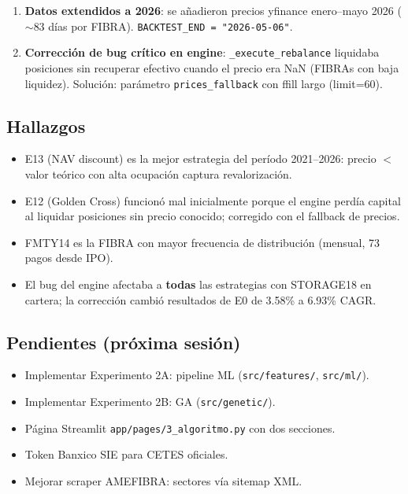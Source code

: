 \documentclass[12pt, a4paper]{article}
\begin{document}
\begin{enumerate}
  \item \textbf{Datos extendidos a 2026}: se a\~{n}adieron precios yfinance enero--mayo 2026
        ($\sim$83 d\'{i}as por FIBRA). \texttt{BACKTEST\_END = "2026-05-06"}.

  \item \textbf{Correcci\'{o}n de bug cr\'{i}tico en engine}: \texttt{\_execute\_rebalance} liquidaba posiciones
        sin recuperar efectivo cuando el precio era NaN (FIBRAs con baja liquidez).
        Soluci\'{o}n: par\'{a}metro \texttt{prices\_fallback} con ffill largo (limit=60).

\end{enumerate}

\subsection{Hallazgos}
\begin{itemize}
  \item E13 (NAV discount) es la mejor estrategia del per\'{i}odo 2021--2026:
        precio $<$ valor te\'{o}rico con alta ocupaci\'{o}n captura revalorizaci\'{o}n.
  \item E12 (Golden Cross) funcion\'{o} mal inicialmente porque el engine perd\'{i}a capital
        al liquidar posiciones sin precio conocido; corregido con el fallback de precios.
  \item FMTY14 es la FIBRA con mayor frecuencia de distribuci\'{o}n (mensual, 73 pagos desde IPO).
  \item El bug del engine afectaba a \textbf{todas} las estrategias con STORAGE18 en cartera;
        la correcci\'{o}n cambi\'{o} resultados de E0 de 3.58\% a 6.93\% CAGR.
\end{itemize}

\subsection{Pendientes (pr\'{o}xima sesi\'{o}n)}
\begin{itemize}
  \item[$\square$] Implementar Experimento 2A: pipeline ML (\texttt{src/features/}, \texttt{src/ml/}).
  \item[$\square$] Implementar Experimento 2B: GA (\texttt{src/genetic/}).
  \item[$\square$] P\'{a}gina Streamlit \texttt{app/pages/3\_algoritmo.py} con dos secciones.
  \item[$\square$] Token Banxico SIE para CETES oficiales.
  \item[$\square$] Mejorar scraper AMEFIBRA: sectores v\'{i}a sitemap XML.
\end{itemize}
\end{document}
